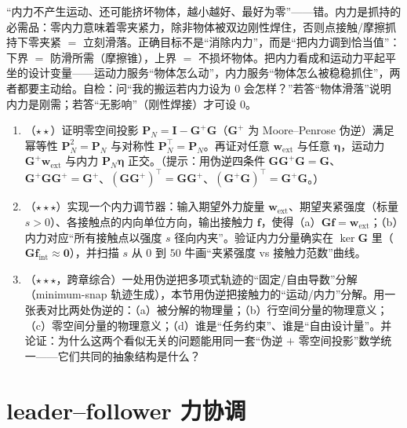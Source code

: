 \begin{pitfall}
“内力不产生运动、还可能挤坏物体，越小越好、最好为零”——错。内力是抓持的必需品：零内力意味着零夹紧力，除非物体被双边刚性焊住，否则点接触/摩擦抓持下零夹紧 $=$ 立刻滑落。正确目标不是“消除内力”，而是“把内力调到恰当值”：下界 $=$ 防滑所需（摩擦锥），上界 $=$ 不损坏物体。把内力看成和运动力平起平坐的设计变量——运动力服务“物体怎么动”，内力服务“物体怎么被稳稳抓住”，两者都要主动给。自检：问“我的搬运若内力设为 $0$ 会怎样？”若答“物体滑落”说明内力是刚需；若答“无影响”（刚性焊接）才可设 $0$。
\end{pitfall}

\begin{practice}
\begin{enumerate}
  \item （$\star\star$）证明零空间投影 $\mathbf{P}_N=\mathbf{I}-\mathbf{G}^{+}\mathbf{G}$（$\mathbf{G}^{+}$ 为 Moore--Penrose 伪逆）满足幂等性 $\mathbf{P}_N^2=\mathbf{P}_N$ 与对称性 $\mathbf{P}_N^\top=\mathbf{P}_N$。再证对任意 $\mathbf{w}_{\text{ext}}$ 与任意 $\boldsymbol{\eta}$，运动力 $\mathbf{G}^{+}\mathbf{w}_{\text{ext}}$ 与内力 $\mathbf{P}_N\boldsymbol{\eta}$ 正交。（提示：用伪逆四条件 $\mathbf{G}\mathbf{G}^{+}\mathbf{G}=\mathbf{G}$、$\mathbf{G}^{+}\mathbf{G}\mathbf{G}^{+}=\mathbf{G}^{+}$、$(\mathbf{G}\mathbf{G}^{+})^\top=\mathbf{G}\mathbf{G}^{+}$、$(\mathbf{G}^{+}\mathbf{G})^\top=\mathbf{G}^{+}\mathbf{G}$。）
  \item （$\star\star\star$）实现一个内力调节器：输入期望外力旋量 $\mathbf{w}_{\text{ext}}$、期望夹紧强度（标量 $s>0$）、各接触点的内向单位方向，输出接触力 $\mathbf{f}$，使得（a）$\mathbf{G}\mathbf{f}=\mathbf{w}_{\text{ext}}$；（b）内力对应“所有接触点以强度 $s$ 径向内夹”。验证内力分量确实在 $\ker\mathbf{G}$ 里（$\mathbf{G}\mathbf{f}_{\text{int}}\approx\mathbf{0}$），并扫描 $s$ 从 $0$ 到 $50$ 牛画“夹紧强度 vs 接触力范数”曲线。
  \item （$\star\star\star$，跨章综合）一处用伪逆把多项式轨迹的“固定/自由导数”分解（minimum-snap 轨迹生成），本节用伪逆把接触力的“运动/内力”分解。用一张表对比两处伪逆的：（a）被分解的物理量；（b）行空间分量的物理意义；（c）零空间分量的物理意义；（d）谁是“任务约束”、谁是“自由设计量”。并论证：为什么这两个看似无关的问题能用同一套“伪逆 $+$ 零空间投影”数学统一——它们共同的抽象结构是什么？
\end{enumerate}
\end{practice}

\section{leader--follower 力协调}
\label{sec:cm-leader}

